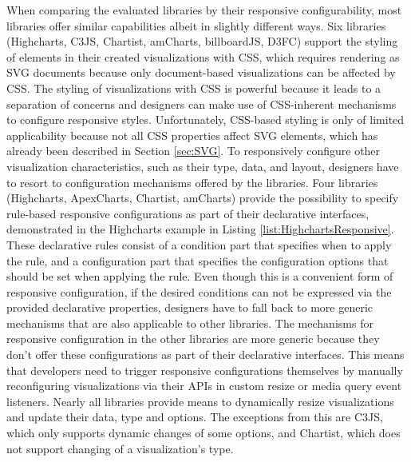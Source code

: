 When comparing the evaluated libraries by their responsive configurability, most libraries offer similar capabilities albeit in slightly different ways.
Six libraries (Highcharts, C3JS, Chartist, amCharts, billboardJS, D3FC) support the styling of elements in their created visualizations with CSS, which requires rendering as SVG documents because only document-based visualizations can be affected by CSS.
The styling of visualizations with CSS is powerful because it leads to a separation of concerns and designers can make use of CSS-inherent mechanisms to configure responsive styles.
Unfortunately, CSS-based styling is only of limited applicability because not all CSS properties affect SVG elements, which has already been described in Section \ref{sec:SVG}.
To responsively configure other visualization characteristics, such as their type, data, and layout, designers have to resort to configuration mechanisms offered by the libraries. 
Four libraries (Highcharts, ApexCharts, Chartist, amCharts) provide the possibility to specify rule-based responsive configurations as part of their declarative interfaces, demonstrated in the Highcharts example in Listing \ref{list:HighchartsResponsive}.
These declarative rules consist of a condition part that specifies when to apply the rule, and a configuration part that specifies the configuration options that should be set when applying the rule.
Even though this is a convenient form of responsive configuration, if the desired conditions can not be expressed via the provided declarative properties, designers have to fall back to more generic mechanisms that are also applicable to other libraries. 
The mechanisms for responsive configuration in the other libraries are more generic because they don't offer these configurations as part of their declarative interfaces. 
This means that developers need to trigger responsive configurations themselves by manually reconfiguring visualizations via their APIs in custom resize or media query event listeners.
Nearly all libraries provide means to dynamically resize visualizations and update their data, type and options.
The exceptions from this are C3JS, which only supports dynamic changes of some options, and Chartist, which does not support changing of a visualization's type.

\begin{samepage}
 example demonstrates how responsive rules can be declared to configure various aspects of a visualization in relation to the size of the viewport.
  },
]{listings/highcharts-responsive.js}
\end{samepage}